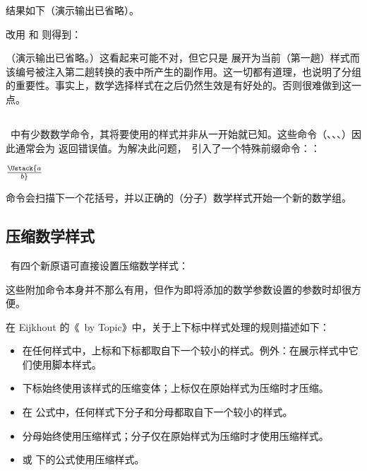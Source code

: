 
结果如下（演示输出已省略）。

改用  和  则得到：

（演示输出已省略。）这看起来可能不对，但它只是  展开为当前（第一趟）样式而该编号被注入第二趟转换的表中所产生的副作用。这一切都有道理，也说明了分组的重要性。事实上，数学选择样式在之后仍然生效是有好处的。否则很难做到这一点。

\subsection{}


\TEX\ 中有少数数学命令，其将要使用的样式并非从一开始就已知。这些命令（、、、）因此通常会为  返回错误值。为解决此问题，\LUATEX\ 引入了一个特殊前缀命令：：

\begin{typing}
$\Ustack {a \over b}$
\end{typing}

 命令会扫描下一个花括号，并以正确的（分子）数学样式开始一个新的数学组。

\subsection{压缩数学样式}


\LUATEX\ 有四个新原语可直接设置压缩数学样式：

\begin{typing}
\crampeddisplaystyle
\crampedtextstyle
\crampedscriptstyle
\crampedscriptscriptstyle
\end{typing}

这些附加命令本身并不那么有用，但作为即将添加的数学参数设置的参数时却很方便。

在 Eijkhout 的《\TEX\ by Topic》中，关于上下标中样式处理的规则描述如下：

\begin{itemize}\item 在任何样式中，上标和下标都取自下一个较小的样式。例外：在展示样式中它们使用脚本样式。

\item 下标始终使用该样式的压缩变体；上标仅在原始样式为压缩时才压缩。

\item 在  公式中，任何样式下分子和分母都取自下一个较小的样式。

\item 分母始终使用压缩样式；分子仅在原始样式为压缩时才使用压缩样式。

\item \type {\sqrt} 或  下的公式使用压缩样式。

\end{itemize}

